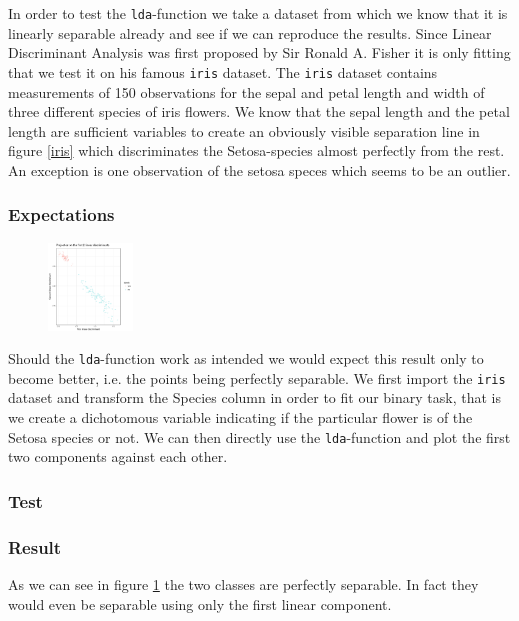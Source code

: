 \documentclass{article}
\begin{document}
In order to test the \texttt{lda}-function we take a dataset from which we know that it is linearly separable already and see if we can reproduce the results. Since Linear Discriminant Analysis was first proposed by Sir Ronald A. Fisher it is only fitting that we test it on his famous \texttt{iris} dataset. The \texttt{iris} dataset contains measurements of 150 observations for the sepal and petal length and width of three different species of iris flowers. We know that the sepal length and the petal length are sufficient variables to create an obviously visible separation line in figure \ref{iris} which discriminates the Setosa-species almost perfectly from the rest. An exception is one observation of the setosa speces which seems to be an outlier. 

\subsubsection{Expectations}

\begin{figure}
\label{irisLDA}
\includegraphics[width=0.2\textwidth, trim={10mm 20mm 30mm 30mm}]{../LDA/irisLDA.png}
\end{figure}

Should the \texttt{lda}-function work as intended we would expect this result only to become better, i.e. the points being perfectly separable. We first import the \texttt{iris} dataset and transform the Species column in order to fit our binary task, that is we create a dichotomous variable indicating if the particular flower is of the Setosa species or not. We can then directly use the \texttt{lda}-function and plot the first two components against each other.
\subsubsection{Test}


\subsubsection{Result}
As we can see in figure \ref{irisLDA} the two classes are perfectly separable. In fact they would even be separable using only the first linear component.
\end{document}
